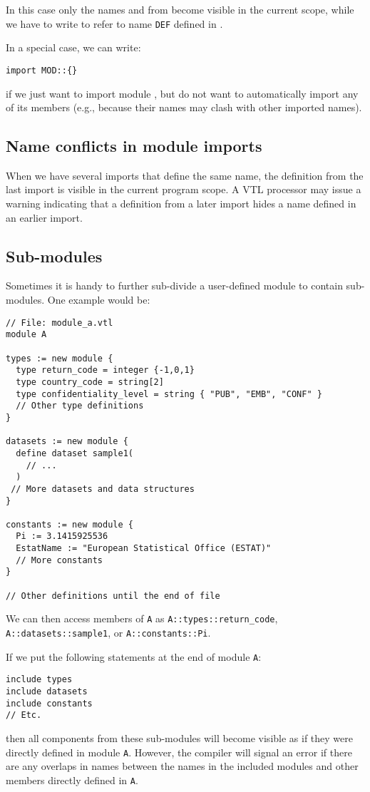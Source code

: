 \documentclass[droidmono,libertine,twoside,user,unofficial]{ecarticle}
\begin{document}
In this case only the names  and  from 
become visible in the current scope, while we have to write
 to refer to name \texttt{DEF} defined in .

In a special case, we can write:
\begin{lstlisting}
import MOD::{}
\end{lstlisting}
if we just want to import module , but do not want to
automatically import any of its members (e.g., because their names may
clash with other imported names).

\subsection{Name conflicts in module imports}
\label{sec:name-confl-module}

When we have several imports that define the same name, the definition
from the last import is visible in the current program scope.  A VTL
processor may issue a warning indicating that a definition from a
later import hides a name defined in an earlier import.


\subsection{Sub-modules}
\label{sec:sub-modules}

Sometimes it is handy to further sub-divide a user-defined module to
contain sub-modules.  One example would be:
\begin{lstlisting}
// File: module_a.vtl
module A

types := new module {
  type return_code = integer {-1,0,1}
  type country_code = string[2]
  type confidentiality_level = string { "PUB", "EMB", "CONF" }
  // Other type definitions
}

datasets := new module {
  define dataset sample1(
    // ...
  )
 // More datasets and data structures
}

constants := new module {
  Pi := 3.1415925536
  EstatName := "European Statistical Office (ESTAT)"
  // More constants
}

// Other definitions until the end of file
\end{lstlisting}

We can then access members of \texttt{A} as
\texttt{A::types::return_code},
\texttt{A::datasets::sample1}, or \texttt{A::constants::Pi}.

If we put the following statements at the end of module \texttt{A}:
\begin{lstlisting}
include types
include datasets
include constants
// Etc.
\end{lstlisting}
then all components from these sub-modules will become visible as if
they were directly defined in module \texttt{A}.  However, the
compiler will signal an error if there are any overlaps in names
between the names in the included modules and other members directly
defined in \texttt{A}.
\end{document}
